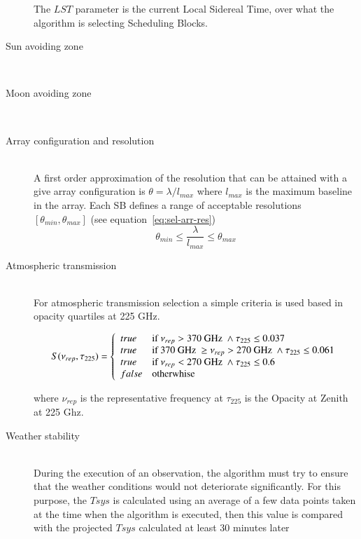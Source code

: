 \begin{description}
The $LST$ parameter is the current Local Sidereal Time, over what the algorithm is selecting Scheduling Blocks.

\item[Sun avoiding zone] \hfill \\

\item[Moon avoiding zone] \hfill \\

\item[Array configuration and resolution] \hfill \\
A first order approximation of the resolution that can be attained with a give
array configuration is $\theta = \lambda / l_{max}$ where $l_{max}$ is the maximum
baseline in the array. Each SB defines a range of acceptable resolutions $[\theta_{min}, \theta_{max}]$ (see equation~\ref{eq:sel-arr-res})
\begin{equation}
\label{eq:sel-arr-res}
\theta_{min} \leq \frac{\lambda}{l_{max}} \leq \theta_{max}
\end{equation}

\item[Atmospheric transmission] \hfill \\
For atmospheric transmission selection a simple criteria is used based in opacity quartiles at 225 GHz.

\begin{equation}
S(\nu_{rep}, \tau_{225}) = \left\{
    \begin{array}{l l}
    true & \mbox{if } \nu_{rep} > 370 \mbox{ GHz } \land \tau_{225} \leq 0.037 \\
    true & \mbox{if } 370 \mbox{ GHz } \geq \nu_{rep} > 270 \mbox{ GHz } \land \tau_{225} \leq 0.061 \\
    true & \mbox{if } \nu_{rep} < 270 \mbox{ GHz } \land \tau_{225} \leq 0.6\\
    false & \mbox{otherwhise}
    \end{array} \right . 
\end{equation}

where $\nu_{rep}$ is the representative frequency at $\tau_{225}$ is the Opacity
at Zenith at 225 Ghz.

\item[Weather stability] \hfill \\
During the execution of an observation, the algorithm must try to ensure that the weather conditions would not deteriorate significantly.
For this purpose, the $Tsys$ is calculated using an average of a few data
points taken at the time when the algorithm is executed, then this value is compared with the
projected $Tsys$ calculated at least 30 minutes later


\end{description}
